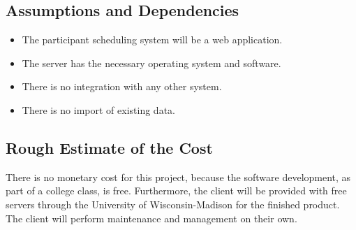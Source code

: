 \subsection{Assumptions and Dependencies}
\begin{itemize}
\item The participant scheduling system will be a web application.
\item The server has the necessary operating system and software.
\item There is no integration with any other system.
\item There is no import of existing data.
\end{itemize}
\subsection{Rough Estimate of the Cost}
There is no monetary cost for this project, because the software development, as part of a college class, is free. Furthermore, the client will be provided with free servers through the University of Wisconsin-Madison for the finished product. The client will perform maintenance and management on their own.
\clearpage

